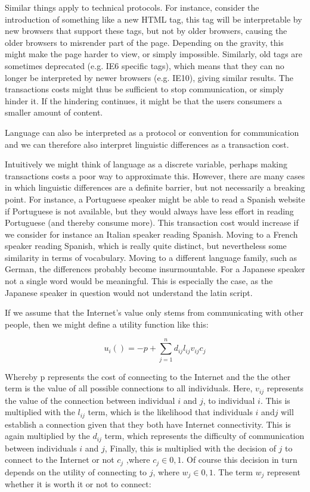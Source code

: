 \documentclass[a4paper,british]{article}\usepackage[]{graphicx}\usepackage[]{xcolor}
\begin{document}
Similar things apply to technical protocols. For instance, consider
the introduction of something like a new HTML tag, this tag will be
interpretable by new browsers that support these tags, but not by
older browsers, causing the older browsers to misrender part of the
page. Depending on the gravity, this might make the page harder to
view, or simply impossible. Similarly, old tags are sometimes deprecated
(e.g. IE6 specific tags), which means that they can no longer be interpreted
by newer browsers (e.g. IE10), giving similar results. The transactions
costs might thus be sufficient to stop communication, or simply hinder
it. If the hindering continues, it might be that the users consumers
a smaller amount of content.

Language can also be interpreted as a protocol or convention for communication
and we can therefore also interpret linguistic differences as a transaction
cost.

Intuitively we might think of language as a discrete variable, perhaps
making transactions costs a poor way to approximate this. However,
there are many cases in which linguistic differences are a definite
barrier, but not necessarily a breaking point. For instance, a Portuguese
speaker might be able to read a Spanish website if Portuguese is not
available, but they would always have less effort in reading Portuguese
(and thereby consume more). This transaction cost would increase if
we consider for instance an Italian speaker reading Spanish. Moving
to a French speaker reading Spanish, which is really quite distinct,
but nevertheless some similarity in terms of vocabulary. Moving to
a different language family, such as German, the differences probably
become insurmountable. For a Japanese speaker not a single word would
be meaningful. This is especially the case, as the Japanese speaker
in question would not understand the latin script. 

If we assume that the Internet's value only stems from communicating
with other people, then we might define a utility function like this: 

\begin{equation}
u_{i}()=-p+\sum_{j=1}^{n}d_{ij}l_{ij}v_{ij}c_{j}
\end{equation}

Whereby p represents the cost of connecting to the Internet and the
the other term is the value of all possible connections to all individuals.
Here, $v_{ij}$ represents the value of the connection between individual
$i$ and $j$, to individual $i$. This is multiplied with the $l_{ij}$
term, which is the likelihood that individuals $i$ and$j$ will establish
a connection given that they both have Internet connectivity. This
is again multiplied by the $d_{ij}$ term, which represents the difficulty
of communication between individuals $i$ and $j$, Finally, this
is multiplied with the decision of $j$ to connect to the Internet
or not $c_{j}$ ,where $c_{j}\in{0,1}$. Of course this decision in
turn depends on the utility of connecting to $j$, where $w_{j}\in{0,1}$.
The term $w_{j}$ represent whether it is worth it or not to connect:
\end{document}
